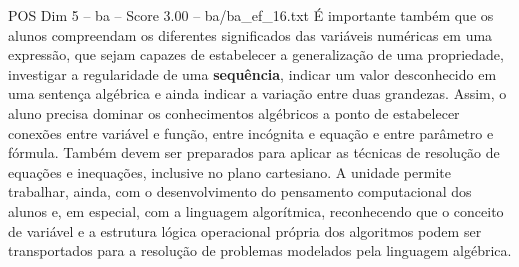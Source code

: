 \begin{textsample}{POS Dim 5 – ba – Score 3.00 – ba/ba\_ef\_16.txt}
É importante também que os alunos compreendam os diferentes significados das variáveis numéricas em uma expressão, que sejam capazes de estabelecer a generalização de uma propriedade, investigar a regularidade de uma \textbf{sequência}, indicar um valor desconhecido em uma sentença algébrica e ainda indicar a variação entre duas grandezas.
Assim, o aluno precisa dominar os conhecimentos algébricos a ponto de estabelecer conexões entre variável e função, entre incógnita e equação e entre parâmetro e fórmula.
Também devem ser preparados para aplicar as técnicas de resolução de equações e inequações, inclusive no plano cartesiano.
A unidade permite trabalhar, ainda, com o desenvolvimento do pensamento computacional dos alunos e, em especial, com a linguagem algorítmica, reconhecendo que o conceito de variável e a estrutura lógica operacional própria dos algoritmos podem ser transportados para a resolução de problemas modelados pela linguagem algébrica.

\end{textsample}
